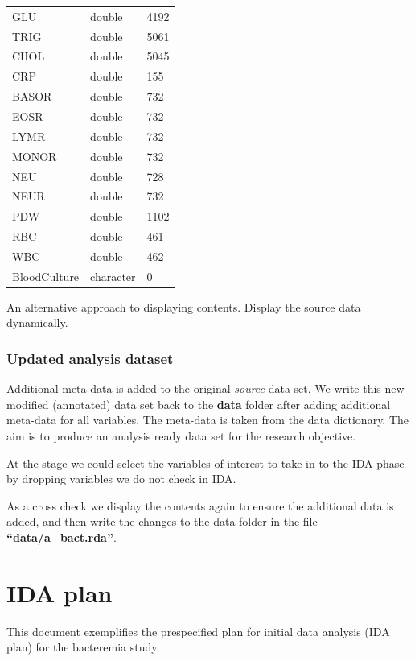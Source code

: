 \documentclass[
  letterpaper,
  DIV=11,
  numbers=noendperiod]{scrreport}
\begin{document}
\begin{longtable}[]{@{}lll@{}}
GLU & double & 4192 \\
TRIG & double & 5061 \\
CHOL & double & 5045 \\
CRP & double & 155 \\
BASOR & double & 732 \\
EOSR & double & 732 \\
LYMR & double & 732 \\
MONOR & double & 732 \\
NEU & double & 728 \\
NEUR & double & 732 \\
PDW & double & 1102 \\
RBC & double & 461 \\
WBC & double & 462 \\
BloodCulture & character & 0 \\
\bottomrule()
\end{longtable}

An alternative approach to displaying contents. Display the source data
dynamically.

\hypertarget{updated-analysis-dataset}{%
\subsection{Updated analysis dataset}\label{updated-analysis-dataset}}

Additional meta-data is added to the original \emph{source} data set. We
write this new modified (annotated) data set back to the \textbf{data}
folder after adding additional meta-data for all variables. The
meta-data is taken from the data dictionary. The aim is to produce an
analysis ready data set for the research objective.

At the stage we could select the variables of interest to take in to the
IDA phase by dropping variables we do not check in IDA.

As a cross check we display the contents again to ensure the additional
data is added, and then write the changes to the data folder in the file
\textbf{``data/a\_bact.rda''}.


\hypertarget{IDA_plan}{%
\chapter{IDA plan}\label{IDA_plan}}

This document exemplifies the prespecified plan for initial data
analysis (IDA plan) for the bacteremia study.
\end{document}

